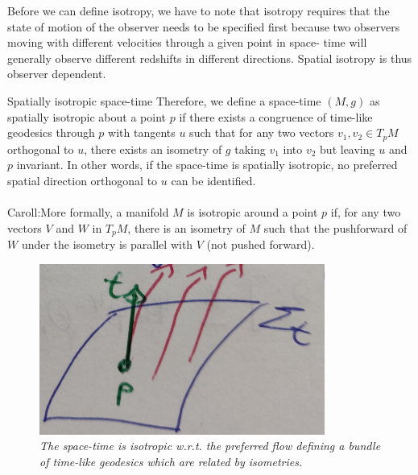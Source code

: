 Before we can define isotropy, we have to note that isotropy requires that
the state of motion of the observer needs to be specified first because two
observers moving with different velocities through a given point in space-
time will generally observe different redshifts in different directions. Spatial isotropy is thus observer dependent.
\begin{mybox}{Spatially isotropic space-time}
	Therefore, we define a space-time $(M, g)$ as spatially isotropic about a
	point $p$ if there exists a congruence of time-like geodesics through $p$
	with tangents $u$ such that for any two vectors $v_1 , v_2 \in T_p M$ orthogonal
	to $u$, there exists an isometry of $g$ taking $v_1$ into $v_2$ but leaving $u$ and
	$p$ invariant. In other words, if the space-time is spatially isotropic, no
	preferred spatial direction orthogonal to $u$ can be identified.\\
	\\Caroll:More formally, a manifold $M$ is isotropic around a point $p$ if, for any two vectors $V$ and $W$
	in $T_p M$, there is an isometry of $M$ such that the pushforward of $W$ under the isometry is
	parallel with $V$ (not pushed forward).
\end{mybox}
\begin{figure}
	\centering
	\includegraphics[width=0.7\linewidth]{gfx/IsotropicSpacetime}
	\caption{\itshape The space-time is isotropic w.r.t. the preferred flow defining a bundle of time-like geodesics which are related by isometries.}
	\label{fig:isotropicspacetime}
\end{figure}


